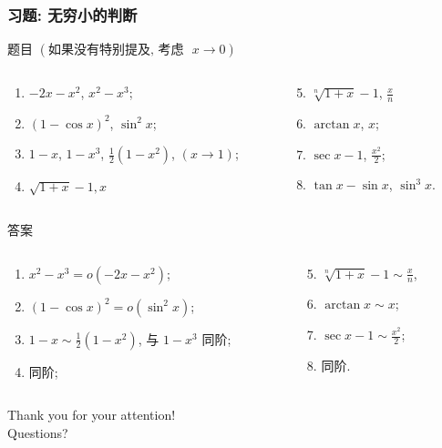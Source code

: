 \documentclass[
10pt,
aspectratio=43,
]{beamer}
\begin{document}
  \begin{frame}
	\frametitle{习题: 无穷小的判断 }
	\begin{block}{题目 $(\text{如果没有特别提及, 考虑 }\,\,x\to0)$}
		\begin{columns}[onlytextwidth]
		  \begin{column}{0.5\textwidth}
			\begin{enumerate}
			  \item $-2x-x^2$, $x^2-x^3$;
			  \item $(1-\cos x)^2$, $\sin^2 x$;
			  \item $1-x$, $1-x^3$, $\frac{1}{2}(1-x^2)$, $(x\to1)$;
			  \item $\sqrt{1+x}-1, x$
			\end{enumerate}
		  \end{column}
		  \begin{column}{0.5\textwidth}
			\begin{enumerate}
			  \setcounter{enumi}{4}
			  \item $\displaystyle\sqrt[n]{1+x}-1$, $\displaystyle\frac{x}{n}$
			  \item $\arctan x$, $x$;
			  \item $\sec x-1$, $\displaystyle\frac{x^2}{2}$;
			  \item $\tan x-\sin x$, $\sin^3 x$.
			\end{enumerate}
		  \end{column}
		\end{columns}
	  \end{block}
	  \begin{exampleblock}{答案}
		\begin{columns}[onlytextwidth]
			\begin{column}{0.5\textwidth}
				\begin{enumerate}
					\item $x^2-x^3=o(-2x-x^2)$;
					      \pause
					\item $(1-\cos x)^2=o(\sin^2 x)$;
					\pause
					\item $1-x \sim \frac{1}{2}(1-x^2)$, 与 $1-x^3$ 同阶;
					\pause
					\item 同阶;
				\end{enumerate}
			\end{column}
			\begin{column}{0.5\textwidth}
				\begin{enumerate}
					\setcounter{enumi}{4}
					\pause
					\item $\displaystyle\sqrt[n]{1+x}-1\sim\displaystyle\frac{x}{n}$,
					\pause
					\item $\arctan x\sim x$;
					\pause
					\item $\sec x-1\sim\displaystyle\frac{x^2}{2}$;
					\pause
					\item 同阶.
				\end{enumerate}
			\end{column}
		\end{columns}
	\end{exampleblock}
  \end{frame}

\begin{frame}[plain]
	\vfill
	\centering
	{
		\centering \Huge \color{white} Thank you for your attention!\\[10pt]Questions?\\
	}
	\vfill
\end{frame}
\end{document}
